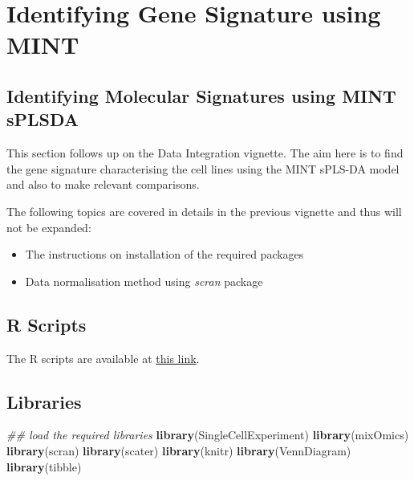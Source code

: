\documentclass[]{book}
\newenvironment{Shaded}{\begin{snugshade}}{\end{snugshade}}
\newcommand{\CommentTok}[1]{\textcolor[rgb]{0.56,0.35,0.01}{\textit{#1}}}
\newcommand{\KeywordTok}[1]{\textcolor[rgb]{0.13,0.29,0.53}{\textbf{#1}}}
\newcommand{\NormalTok}[1]{#1}
\providecommand{\tightlist}{%
  \setlength{\itemsep}{0pt}\setlength{\parskip}{0pt}}
\theoremstyle{definition}
\theoremstyle{definition}
\theoremstyle{definition}
\theoremstyle{remark}
\begin{document}
\hypertarget{identifying-gene-signature-using-mint}{%
\chapter{Identifying Gene Signature using
MINT}\label{identifying-gene-signature-using-mint}}

\hypertarget{identifying-molecular-signatures-using-mint-splsda}{%
\section{Identifying Molecular Signatures using MINT
sPLSDA}\label{identifying-molecular-signatures-using-mint-splsda}}

This section follows up on the Data Integration vignette. The aim here
is to find the gene signature characterising the cell lines using the
MINT sPLS-DA model and also to make relevant comparisons.

The following topics are covered in details in the previous vignette and
thus will not be expanded:

\begin{itemize}
\tightlist
\item
  The instructions on installation of the required packages
\item
  Data normalisation method using \emph{scran} package
\end{itemize}

\hypertarget{r-scripts-1}{%
\section{R Scripts}\label{r-scripts-1}}

The R scripts are available at
\href{https://github.com/AJABADI/MINT_sPLSDA/blob/master/02-Signature.R}{this
link}.

\hypertarget{libraries-1}{%
\section{Libraries}\label{libraries-1}}

\begin{Shaded}
\begin{Highlighting}[]
\CommentTok{## load the required libraries}
\KeywordTok{library}\NormalTok{(SingleCellExperiment)}
\KeywordTok{library}\NormalTok{(mixOmics)}
\KeywordTok{library}\NormalTok{(scran)}
\KeywordTok{library}\NormalTok{(scater)}
\KeywordTok{library}\NormalTok{(knitr)}
\KeywordTok{library}\NormalTok{(VennDiagram)}
\KeywordTok{library}\NormalTok{(tibble)}
\end{Highlighting}
\end{Shaded}
\end{document}

